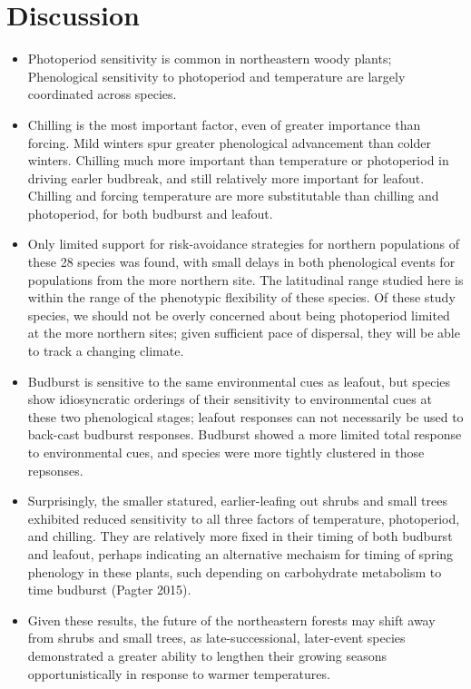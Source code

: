 \documentclass{article}
\begin{document}
\section*{Discussion}

\begin{itemize}

\item{Photoperiod sensitivity is common in northeastern woody plants; Phenological sensitivity to photoperiod and temperature are largely coordinated across species.}
\item{Chilling is the most important factor, even of greater importance than forcing. Mild winters spur greater phenological advancement than colder winters. Chilling much more important than temperature or photoperiod in driving earler budbreak, and still relatively more important for leafout. Chilling and forcing temperature are more substitutable than chilling and photoperiod, for both budburst and leafout.}
\item{Only limited support for risk-avoidance strategies for northern populations of these 28 species was found, with small delays in both phenological events for populations from the more northern site. The latitudinal range studied here is within the range of the phenotypic flexibility of these species. Of these study species, we should not be overly concerned about being photoperiod limited at the more northern sites; given sufficient pace of dispersal, they will be able to track a changing climate.}
\item{Budburst is sensitive to the same environmental cues as leafout, but species show idiosyncratic orderings of their sensitivity to environmental cues at these two phenological stages; leafout responses can not necessarily be used to back-cast budburst responses. Budburst showed a more limited total response to environmental cues, and species were more tightly clustered in those repsonses.}
\item{Surprisingly, the smaller statured, earlier-leafing out shrubs and small trees exhibited reduced sensitivity to all three factors of temperature, photoperiod, and chilling. They are relatively more fixed in their timing of both budburst and leafout, perhaps indicating an alternative mechaism for timing of spring phenology in these plants, such depending on carbohydrate metabolism to time budburst (Pagter 2015).}
\item{Given these results, the future of the northeastern forests may shift away from shrubs and small trees, as late-successional, later-event species demonstrated a greater ability to lengthen their growing seasons opportunistically in response to warmer temperatures.} %
\end{itemize}
\end{document}
